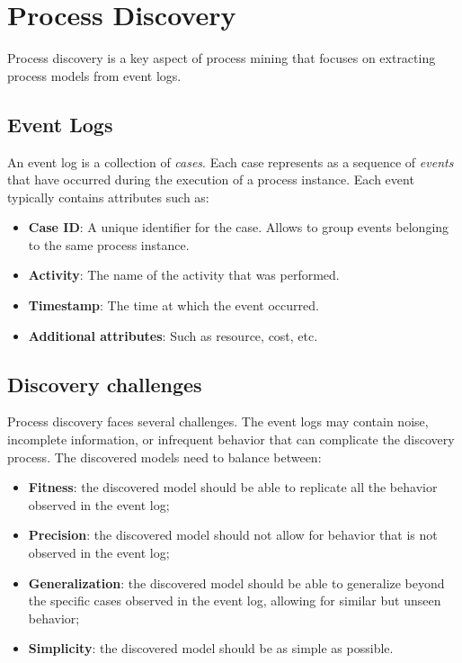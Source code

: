 \section{Process Discovery}
Process discovery is a key aspect of process mining that focuses on extracting process models from event logs.
\subsection{Event Logs}
An event log is a collection of \textit{cases}. Each case represents as a sequence of \textit{events} that have occurred during the execution of a process instance.
Each event typically contains attributes such as:
\begin{itemize}
    \item \textbf{Case ID}: A unique identifier for the case. Allows to group events belonging to the same process instance.
    \item \textbf{Activity}: The name of the activity that was performed.
    \item \textbf{Timestamp}: The time at which the event occurred.
    \item \textbf{Additional attributes}: Such as resource, cost, etc.
\end{itemize}
\subsection{Discovery challenges}
Process discovery faces several challenges. The event logs may contain noise, incomplete information, or infrequent behavior that can complicate the discovery process.
The discovered models need to balance between:
\begin{itemize}
    \item \textbf{Fitness}: the discovered model should be able to replicate all the behavior observed in the event log;
    \item \textbf{Precision}: the discovered model should not allow for behavior that is not observed in the event log;
    \item \textbf{Generalization}: the discovered model should be able to generalize beyond the specific cases observed in the event log, allowing for similar but unseen behavior;
    \item \textbf{Simplicity}: the discovered model should be as simple as possible.
\end{itemize}
